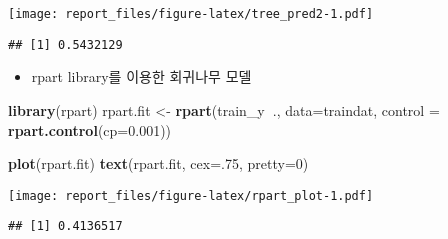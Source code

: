 \documentclass[]{article}
\newenvironment{Shaded}{\begin{snugshade}}{\end{snugshade}}
\newcommand{\DataTypeTok}[1]{\textcolor[rgb]{0.13,0.29,0.53}{#1}}
\newcommand{\DecValTok}[1]{\textcolor[rgb]{0.00,0.00,0.81}{#1}}
\newcommand{\FloatTok}[1]{\textcolor[rgb]{0.00,0.00,0.81}{#1}}
\newcommand{\KeywordTok}[1]{\textcolor[rgb]{0.13,0.29,0.53}{\textbf{#1}}}
\newcommand{\NormalTok}[1]{#1}
\newcommand{\OperatorTok}[1]{\textcolor[rgb]{0.81,0.36,0.00}{\textbf{#1}}}
\newcommand{\StringTok}[1]{\textcolor[rgb]{0.31,0.60,0.02}{#1}}
\providecommand{\tightlist}{%
  \setlength{\itemsep}{0pt}\setlength{\parskip}{0pt}}
\begin{document}
\texttt{[image: report\_files/figure-latex/tree\_pred2-1.pdf]}

\begin{Shaded}
\end{Shaded}

\begin{verbatim}
## [1] 0.5432129
\end{verbatim}

\begin{itemize}
\tightlist
\item
  rpart library를 이용한 회귀나무 모델
\end{itemize}

\begin{Shaded}
\begin{Highlighting}[]
\KeywordTok{library}\NormalTok{(rpart)}
\NormalTok{rpart.fit <-}\StringTok{ }\KeywordTok{rpart}\NormalTok{(train_y}\OperatorTok{~}\NormalTok{., }\DataTypeTok{data=}\NormalTok{traindat, }\DataTypeTok{control =} \KeywordTok{rpart.control}\NormalTok{(}\DataTypeTok{cp=}\FloatTok{0.001}\NormalTok{))}
\end{Highlighting}
\end{Shaded}

\begin{Shaded}
\begin{Highlighting}[]
\KeywordTok{plot}\NormalTok{(rpart.fit)}
\KeywordTok{text}\NormalTok{(rpart.fit, }\DataTypeTok{cex=}\NormalTok{.}\DecValTok{75}\NormalTok{, }\DataTypeTok{pretty=}\DecValTok{0}\NormalTok{)}
\end{Highlighting}
\end{Shaded}

\texttt{[image: report\_files/figure-latex/rpart\_plot-1.pdf]}

\begin{Shaded}
\end{Shaded}

\begin{verbatim}
## [1] 0.4136517
\end{verbatim}
\end{document}
